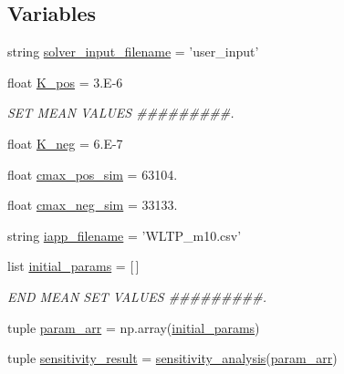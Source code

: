 \subsection*{Variables}
\begin{DoxyCompactItemize}
\item 
string \hyperlink{namespacesensitivity__analysis_a92a75cd7aa57960ca65957a1baa06d77}{solver\-\_\-input\-\_\-filename} = 'user\-\_\-input'
\item 
float \hyperlink{namespacesensitivity__analysis_ab1a8ebec490ba1301f818bd1c5f1f3fa}{K\-\_\-pos} = 3.\-E-\/6
\begin{DoxyCompactList}\small\item\em S\-E\-T M\-E\-A\-N V\-A\-L\-U\-E\-S \#\#\#\#\#\#\#\#\#. \end{DoxyCompactList}\item 
float \hyperlink{namespacesensitivity__analysis_a64d0c5854299798787675bc91586023c}{K\-\_\-neg} = 6.\-E-\/7
\item 
float \hyperlink{namespacesensitivity__analysis_aa5b015cc7d0bda453c6163023448db72}{cmax\-\_\-pos\-\_\-sim} = 63104.
\item 
float \hyperlink{namespacesensitivity__analysis_ab7633a5e9c70aabfe6992e4fe521a1f9}{cmax\-\_\-neg\-\_\-sim} = 33133.
\item 
string \hyperlink{namespacesensitivity__analysis_af0a721bf4042ba266855bd73da684844}{iapp\-\_\-filename} = 'W\-L\-T\-P\-\_\-m10.\-csv'
\item 
list \hyperlink{namespacesensitivity__analysis_af973d7a362a975c2c180328006f497d3}{initial\-\_\-params} = \mbox{[}$\,$\mbox{]}
\begin{DoxyCompactList}\small\item\em E\-N\-D M\-E\-A\-N S\-E\-T V\-A\-L\-U\-E\-S \#\#\#\#\#\#\#\#\#. \end{DoxyCompactList}\item 
tuple \hyperlink{namespacesensitivity__analysis_a86a476e68e0e599be4ea6b1ccb088d46}{param\-\_\-arr} = np.\-array(\hyperlink{namespacesensitivity__analysis_af973d7a362a975c2c180328006f497d3}{initial\-\_\-params})
\item 
tuple \hyperlink{namespacesensitivity__analysis_aa3b49cc44c40ee657d289412379593e5}{sensitivity\-\_\-result} = \hyperlink{namespacesensitivity__analysis_ac9b02f9b013b469537ee70ac8bbeffdb}{sensitivity\-\_\-analysis}(\hyperlink{namespacesensitivity__analysis_a86a476e68e0e599be4ea6b1ccb088d46}{param\-\_\-arr})
\end{DoxyCompactItemize}


